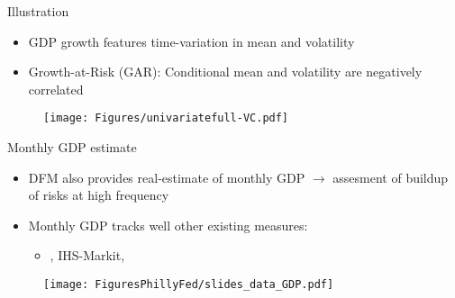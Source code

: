 \documentclass[xcolor=dvipsnames, xcolor=table, 10pt]{beamer}
\newcommand{\rr}[1]{{\color{darkred}#1}}
\begin{document}
\begin{frame}{Illustration}
\vspace*{0.12in}
 \begin{itemize}
     \item GDP growth features time-variation in mean and volatility
    \bigskip
     \item \rr{Growth-at-Risk (GAR)}: Conditional mean and volatility are negatively correlated
\end{itemize}

\begin{figure}
     \texttt{[image: Figures/univariatefull-VC.pdf]}
\end{figure}
\end{frame}


\begin{frame}{Monthly GDP estimate}
\label{app:mgdp}
\begin{itemize}
\item DFM also provides real-estimate of monthly GDP $\rightarrow$ assesment of buildup of risks at high frequency
\bigskip

\item Monthly GDP tracks well other existing measures:
\begin{itemize}
  \medskip
  \item \cite{stock1989new}, IHS-Markit, \cite{lewis2020us}
\end{itemize}

\end{itemize}

\begin{figure}
     \texttt{[image: FiguresPhillyFed/slides\_data\_GDP.pdf]}
\end{figure}
\hyperlink{main:data}{}
\end{frame}

\end{document}
